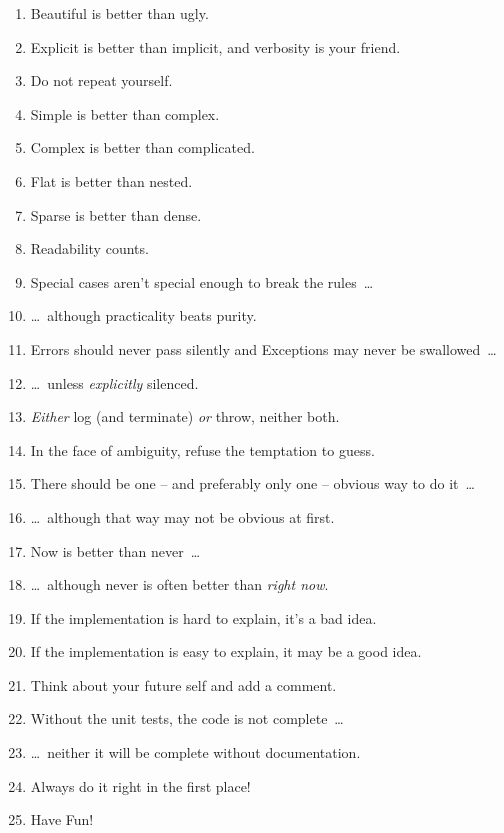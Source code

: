 \begin{enumerate}[nosep]
	\item{Beautiful is better than ugly.}
	\item{Explicit is better than implicit, and verbosity is your friend.}
	\item{Do not repeat yourself.}
	\item{Simple is better than complex.}
	\item{Complex is better than complicated.}
	\item{Flat is better than nested.}
	\item{Sparse is better than dense.}
	\item{Readability counts.}
	\item{Special cases aren't special enough to break the rules~…}
	\item{…~although practicality beats purity.}
	\item{Errors should never pass silently and Exceptions may never be swallowed~…}
	\item{…~unless \textit{explicitly} silenced.}
	\item{\textit{Either} log (and terminate) \textit{or} throw, neither both.}
	\item{In the face of ambiguity, refuse the temptation to guess.}
	\item{There should be one – and preferably only one – obvious way to do it~…}
	\item{…~although that way may not be obvious at first.}
	\item{Now is better than never~…}
	\item{…~although never is often better than \textit{right now}.}
	\item{If the implementation is hard to explain, it's a bad idea.}
	\item{If the implementation is easy to explain, it may be a good idea.}
	\item{Think about your future self and add a comment.}
	\item{Without the unit tests, the code is not complete~…}
	\item{…~neither it will be complete without documentation.}
	\item{Always do it right in the first place!}
	\item{Have Fun!}
\end{enumerate}


